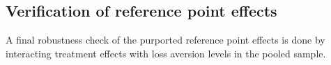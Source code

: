 \documentclass[12pt, letterpaper, DIV=11, numbers=noendperiod]{article}
\begin{document}
\begin{table}
\centering

\caption{Treatment effects on accuracy target achivement likelihood (pooled sample)}\label{tbl-reg-target}
\end{table}

\begin{table}
\centering

\caption{Treatment effects on mistake rate (pooled sample)}\label{tbl-reg-mistakes}
\end{table}

\begin{table}
\centering

\caption{Treatment effects on sets completed (pooled sample)}\label{tbl-reg-sets}
\end{table}

\subsection{Verification of reference point effects}\label{verification-of-reference-point-effects}

A final robustness check of the purported reference point effects is done by interacting treatment effects with loss aversion levels in the pooled sample.
\end{document}
